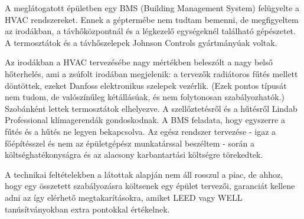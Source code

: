 A meglátogatott épületben egy BMS (Building Management System) felügyelte a HVAC rendszereket. Ennek a géptermébe nem tudtam bemenni, de megfigyeltem az irodákban, a távhőközpontnál és a légkezelő egységeknél található gépészetet. A termosztátok és a távhőszelepek Johnson Controls gyártmányúak voltak.

Az irodákban a HVAC tervezésébe nagy mértékben beleszólt a nagy belső hőterhelés, ami a zsúfolt irodában megjelenik: a tervezők radiátoros fűtés mellett döntöttek, ezeket Danfoss elektronikus szelepek vezérlik. (Ezek pontos típusát nem tudom, de valószínűleg kétállásúak, és nem folytonosan szabályozhatók.) Szobánként lettek termosztátok elhelyezve. A szellőztetésről és a hűtésről Lindab Professional klímagerendák gondoskodnak. A BMS feladata, hogy egyszerre a fűtés és a hűtés ne legyen bekapcsolva. Az egész rendszer tervezése - igaz a főépítésszel és nem az épületgépész munkatárssal beszéltem - során a költséghatékonyságra és az alacsony karbantartási költségre törekedtek.

A technikai feltételekben a látottak alapján nem áll rosszul a piac, de ahhoz, hogy egy összetett szabályozásra költsenek egy épület tervezői, garanciát kellene adni az így elérhető megtakarításokra, amiket LEED vagy WELL tanúsítványokban extra pontokkal értékelnek.

